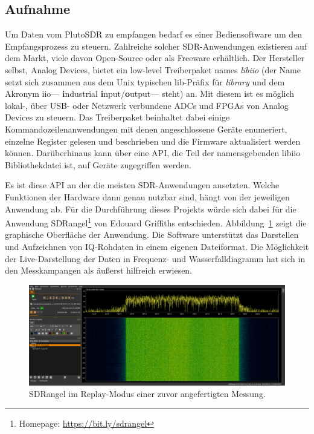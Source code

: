\subsection{Aufnahme}

Um Daten vom PlutoSDR zu empfangen bedarf es einer Bediensoftware um den Empfangsprozess zu steuern. Zahlreiche solcher SDR-Anwendungen existieren auf dem Markt, viele davon Open-Source oder als Freeware erhältlich. Der Hersteller selbst, Analog Devices, bietet ein low-level Treiberpaket names \emph{libiio} (der Name setzt sich zusammen aus dem Unix typischen lib-Präfix für \emph{library} und dem Akronym iio---%
\textbf{i}ndustrial \textbf{i}nput/\textbf{o}utput---%
steht) an. Mit diesem ist es möglich lokal-, über USB- oder Netzwerk verbundene ADCs und FPGAs von Analog Devices zu steuern. Das Treiberpaket beinhaltet dabei einige Kommandozeilenanwendungen mit denen angeschlossene Geräte enumeriert, einzelne Register gelesen und beschrieben und die Firmware ak­tu­a­li­sie­rt werden können. Darüberhinaus kann über eine API, die Teil der namensgebenden libiio Bibliothekdatei ist, auf Geräte zugegriffen werden.

Es ist diese API an der die meisten SDR-Anwendungen ansetzten. Welche Funktionen der Hardware dann genau nutzbar sind, hängt von der jeweiligen Anwendung ab. Für die Durchführung dieses Projekts würde sich dabei für die Anwendung SDRangel\footnote{Homepage: \url{https://bit.ly/sdrangel}} von Edouard Griffiths entschieden. Abbildung~\ref{fig:sdrangel_screenshot} zeigt die graphische Oberfläche der Anwendung. Die Software unterstützt das Darstellen und Aufzeichnen von IQ-Rohdaten in einem eigenen Dateiformat. Die Möglichkeit der Live-Darstellung der Daten in Frequenz- und Wasserfalldiagramm hat sich in den Messkampangen als äußerst hilfreich erwiesen.

\begin{figure}[htb]
    \centering
    \includegraphics[width=\textwidth]{images/sdrangel.png}
    \caption{SDRangel im Replay-Modus einer zuvor angefertigten Messung.}\label{fig:sdrangel_screenshot}
\end{figure}

